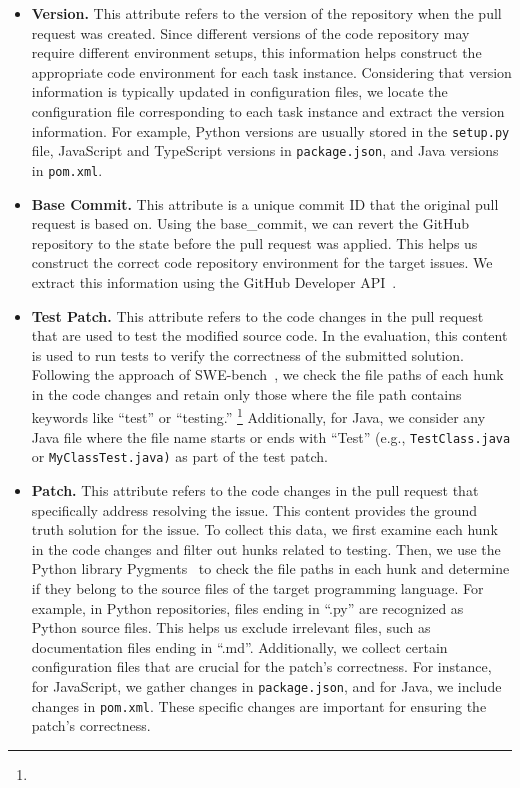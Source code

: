 \begin{itemize}[left=10pt]
    \item \textbf{Version.} This attribute refers to the version of the repository when the pull request was created. Since different versions of the code repository may require different environment setups, this information helps construct the appropriate code environment for each task instance. Considering that version information is typically updated in configuration files, we locate the configuration file corresponding to each task instance and extract the version information. For example, Python versions are usually stored in the \texttt{setup.py} file, JavaScript and TypeScript versions in \texttt{package.json}, and Java versions in \texttt{pom.xml}.
    \item \textbf{Base Commit.} This attribute is a unique commit ID that the original pull request is based on. Using the base\_commit, we can revert the GitHub repository to the state before the pull request was applied. This helps us construct the correct code repository environment for the target issues. We extract this information using the GitHub Developer API~\cite{github-rest-api}.
      \item \textbf{Test Patch.} This attribute refers to the code changes in the pull request that are used to test the modified source code. In the evaluation, this content is used to run tests to verify the correctness of the submitted solution. Following the approach of SWE-bench~\cite{jimenez2023swe}, we check the file paths of each hunk in the code changes and retain only those where the file path contains keywords like ``test'' or ``testing.'' \footnote{} Additionally, for Java, we consider any Java file where the file name starts or ends with ``Test'' (e.g., \texttt{TestClass.java} or \texttt{MyClassTest.java)} as part of the test patch.
    \item \textbf{Patch.} This attribute refers to the code changes in the pull request that specifically address resolving the issue. This content provides the ground truth solution for the issue. To collect this data, we first examine each hunk in the code changes and filter out hunks related to testing. Then, we use the Python library Pygments~\cite{pygments} to check the file paths in each hunk and determine if they belong to the source files of the target programming language. For example, in Python repositories, files ending in ``.py'' are recognized as Python source files. This helps us exclude irrelevant files, such as documentation files ending in ``.md''. Additionally, we collect certain configuration files that are crucial for the patch’s correctness. For instance, for JavaScript, we gather changes in \texttt{package.json}, and for Java, we include changes in \texttt{pom.xml}. These specific changes are important for ensuring the patch's correctness.
    

\end{itemize}
